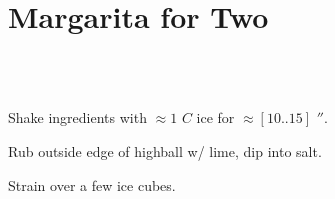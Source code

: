 \section[Margarita for Two]{
    Margarita for Two
}

\begin{recipestats}[
        servings=2,
        preptime=5 \minute,
        source=Mike \& Jane,
        original=\citefield{joyofcooking2006}{title}~\cite{joyofcooking2006},
    ]
\end{recipestats}

\begin{ingredientcolumns}[1]
    \begin{ingredientblock}
        \\
        \\
    \end{ingredientblock}
\end{ingredientcolumns}

\begin{preparation}
\item Shake ingredients with $\approx1$ $C$ ice for $\approx [10 .. 15]$ $\second$.
\item Rub outside edge of highball w/ lime, dip into salt.
\item Strain over a few ice cubes.
\end{preparation}

\recipeend%
